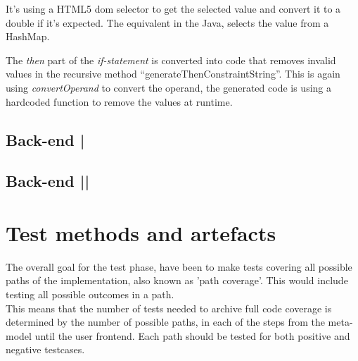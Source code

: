 \documentclass[paper=a4, fontsize=11pt]{scrartcl} %
\numberwithin{equation}{section} %
\numberwithin{figure}{section} %
\numberwithin{table}{section} %
\begin{document}
It’s using a HTML5 dom selector to get the selected value and convert it to a double if it’s expected.
The equivalent in the Java, selects the value from a HashMap.



The \textit{then} part of the \textit{if-statement} is converted into code that removes invalid values in the recursive method “generateThenConstraintString”. This is again using \textit{convertOperand} to convert the operand, the generated code is using a hardcoded function to remove the values at runtime.



\subsection{Back-end |}
\subsection{Back-end ||}

\section{Test methods and artefacts}
The overall goal for the test phase, have been to make tests covering all possible paths of the implementation, also known as 'path coverage'. This would include testing all possible outcomes in a path.\\ 
This means that the number of tests needed to archive full code coverage is determined by the number of possible paths, in each of the steps from the meta-model until the user frontend. Each path should be tested for both positive and negative testcases.\\
\end{document}
